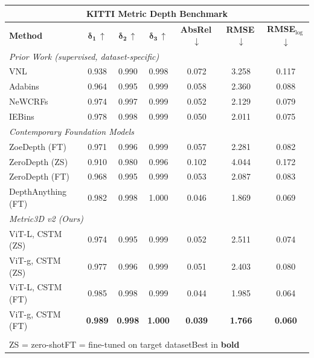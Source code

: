 \documentclass[border=10pt]{standalone}
\begin{document}
\begin{tabular}{@{} l c c c c c c @{}}
\toprule
\multicolumn{7}{c}{\textbf{\color{garnet}\textsf{\large KITTI Metric Depth Benchmark}}} \\[4pt]
\midrule
\textsf{\textbf{Method}} & \textsf{$\boldsymbol{\delta_1}$\,$\uparrow$} & \textsf{$\boldsymbol{\delta_2}$\,$\uparrow$} & \textsf{$\boldsymbol{\delta_3}$\,$\uparrow$} & \textsf{\textbf{AbsRel}\,$\downarrow$} & \textsf{\textbf{RMSE}\,$\downarrow$} & \textsf{\textbf{RMSE}$_{\log}$\,$\downarrow$} \\
\midrule
\multicolumn{7}{l}{\textit{\color{bk90}\textsf{Prior Work (supervised, dataset-specific)}}} \\[2pt]
\textsf{VNL}                & 0.938 & 0.990 & 0.998 & 0.072 & 3.258 & 0.117 \\
\textsf{Adabins}            & 0.964 & 0.995 & 0.999 & 0.058 & 2.360 & 0.088 \\
\textsf{NeWCRFs}            & 0.974 & 0.997 & 0.999 & 0.052 & 2.129 & 0.079 \\
\textsf{IEBins}             & 0.978 & 0.998 & 0.999 & 0.050 & 2.011 & 0.075 \\
\midrule
\multicolumn{7}{l}{\textit{\color{bk90}\textsf{Contemporary Foundation Models}}} \\[2pt]
\textsf{ZoeDepth (FT)}      & 0.971 & 0.996 & 0.999 & 0.057 & 2.281 & 0.082 \\
\textsf{ZeroDepth (ZS)}     & 0.910 & 0.980 & 0.996 & 0.102 & 4.044 & 0.172 \\
\textsf{ZeroDepth (FT)}     & 0.968 & 0.995 & 0.999 & 0.053 & 2.087 & 0.083 \\
\textsf{DepthAnything (FT)} & 0.982 & 0.998 & 1.000 & 0.046 & 1.869 & 0.069 \\
\midrule
\multicolumn{7}{l}{\textit{\color{garnet}\textsf{Metric3D v2 (Ours)}}} \\[2pt]
\rowcolor{highlight} \textsf{ViT-L, CSTM (ZS)}  & 0.974 & 0.995 & 0.999 & 0.052 & 2.511 & 0.074 \\
\rowcolor{highlight} \textsf{ViT-g, CSTM (ZS)}  & 0.977 & 0.996 & 0.999 & 0.051 & 2.403 & 0.080 \\
\rowcolor{highlight} \textsf{ViT-L, CSTM (FT)}  & 0.985 & 0.998 & 0.999 & 0.044 & 1.985 & 0.064 \\
\rowcolor{highlight} \textsf{ViT-g, CSTM (FT)}  & \textbf{0.989} & \textbf{0.998} & \textbf{1.000} & \textbf{0.039} & \textbf{1.766} & \textbf{0.060} \\
\bottomrule
\\[-4pt]
\multicolumn{7}{l}{\scriptsize\textsf{ZS = zero-shot\quad FT = fine-tuned on target dataset\quad Best in \textbf{bold}}} \\
\end{tabular}
\end{document}
